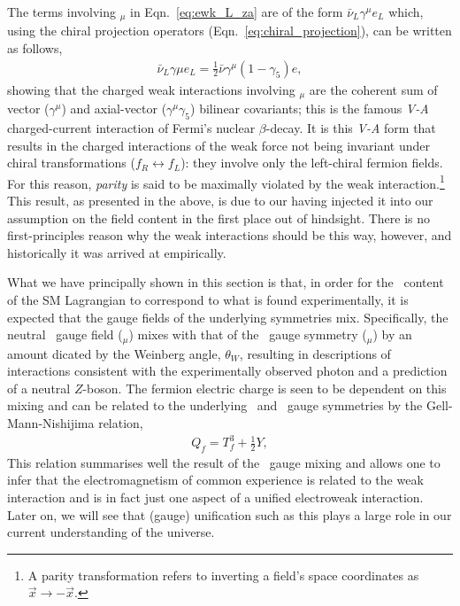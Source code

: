 The terms involving \fieldWpm$_{\mu}$ in Eqn.~\ref{eq:ewk_L_za} are
of the form $\bar{\nu}_L \gamma^{\mu} e_L$
which, using the chiral projection operators (Eqn.~\ref{eq:chiral_projection}), can be
written as follows,
\begin{align}
	\bar{\nu}_L \gamma{\mu} e_L = \frac{1}{2} \bar{\nu} \gamma^{\mu}(1-\gamma_5) e,
	\label{eq:v_minus_a}
\end{align}
showing that the charged weak interactions involving \fieldWpm$_{\mu}$ are the coherent
sum of vector ($\gamma^{\mu}$) and axial-vector ($\gamma^{\mu}\gamma_5$) bilinear covariants; this is the famous
\textit{V-A} charged-current interaction of Fermi's nuclear $\beta$-decay.
It is this \textit{V-A} form that results in the charged interactions of the weak force
not being invariant under chiral transformations ($f_R \leftrightarrow f_L$): they involve only
the left-chiral fermion fields. For this reason, \textit{parity}
is said to be maximally violated by the weak interaction.\footnote{A parity transformation
	refers to inverting a field's space coordinates as $\vec{x} \rightarrow -\vec{x}$.}
This result, as presented in the above, is due to our having injected
it into our assumption on the field content in the first place out of hindsight. There
is no first-principles reason why the weak interactions should be this way, however,
and historically it was arrived at empirically.

What we have principally shown in this section is that, in order for the \SUewk~content of
the SM Lagrangian to correspond to what is found experimentally, it is expected that
the gauge fields of the underlying symmetries mix. Specifically, the neutral \SUtwo~gauge field
(\fieldWzero$_{\mu}$) mixes with that of the \Uone~gauge symmetry (\fieldB$_{\mu}$) by an amount
dicated by the Weinberg angle, $\theta_W$, resulting in descriptions of interactions consistent
with the experimentally observed photon and a prediction of a neutral $Z$-boson. 
The fermion electric charge is seen to be dependent on this mixing
and can be related to the underlying \SUtwo~and \Uone~gauge symmetries by the
Gell-Mann-Nishijima relation,
\begin{align}
	Q_f = T_f^3 + \frac{1}{2}Y,
	\label{eq:gell_mann_nishijima}
\end{align}
This relation summarises well the result of the \SUewk~gauge mixing and allows one to
infer that the electromagnetism of common experience
is related to the weak interaction and is in fact just one aspect of a unified electroweak interaction.
Later on, we will see that (gauge) unification such as this plays a large role in our
current understanding of the universe.

